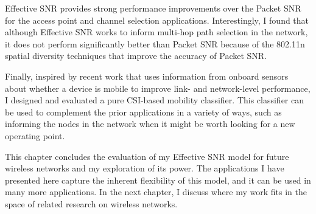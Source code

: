 Effective SNR provides strong performance improvements over the Packet SNR for the access point and channel selection applications. Interestingly, I found that although Effective SNR works to inform multi-hop path selection in the network, it does not perform significantly better than Packet SNR because of the 802.11n spatial diversity techniques that improve the accuracy of Packet SNR.

Finally, inspired by recent work that uses information from onboard sensors about whether a device is mobile to improve link- and network-level performance, I designed and evaluated a pure CSI-based mobility classifier. This classifier can be used to complement the prior applications in a variety of ways, such as informing the nodes in the network when it might be worth looking for a new operating point.

This chapter concludes the evaluation of my Effective SNR model for future wireless networks and my exploration of its power. The applications I have presented here capture the inherent flexibility of this model, and it can be used in many more applications. In the next chapter, I discuss where my work fits in the space of related research on wireless networks.


\ifx\mainfile\undefined

\fi
